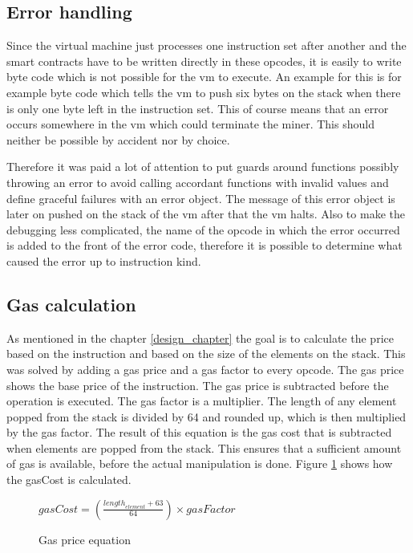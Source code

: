\subsection{Error handling}
Since the virtual machine just processes one instruction set after another and the smart contracts have to be written directly in these opcodes, it is easily to write byte code which is not possible for the vm to execute. An example for this is for example byte code which tells the vm to push six bytes on the stack when there is only one byte left in the instruction set. This of course means that an error occurs somewhere in the vm which could terminate the miner. This should neither be possible by accident nor by choice.

Therefore it was paid a lot of attention to put guards around functions possibly throwing an error to avoid calling accordant functions with invalid values and define graceful failures with an error object. The message of this error object is later on pushed on the stack of the vm after that the vm halts. Also to make the debugging less complicated, the name of the opcode in which the error occurred is added to the front of the error code, therefore it is possible to determine what caused the error up to instruction kind.

\subsection{Gas calculation}
As mentioned in the chapter \ref{design_chapter} the goal is to calculate the price based on the instruction and based on the size of the elements on the stack. This was solved by adding a gas price and a gas factor to every opcode. The gas price shows the base price of the instruction. The gas price is subtracted before the operation is executed. The gas factor is a multiplier. The length of any element popped from the stack is divided by 64 and rounded up, which is then multiplied by the gas factor. The result of this equation is the gas cost that is subtracted when elements are popped from the stack. This ensures that a sufficient amount of gas is available, before the actual manipulation is done. Figure \ref{gas_factor_calc} shows how the gasCost is calculated.


\begin{figure}[thp]%
    	\centering
		$
		gasCost=\left( \frac { { length }_{ element }+63 }{ 64 }  \right) \times gasFactor
		$
		\caption{Gas price equation}
		\label{gas_factor_calc}
\end{figure}


